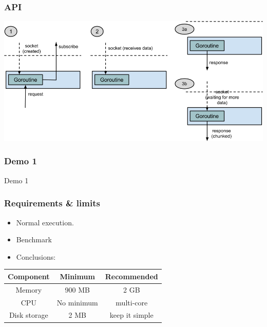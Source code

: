 \documentclass[12pt]{beamer}
\begin{document}
\begin{frame}
\vfill
  \frametitle{API}
  \begin{center}
    \includegraphics[scale=0.45]{images/api.png}
  \end{center}
\vfill
\end{frame}

\begin{frame}
\vfill
  \frametitle{Demo 1}
  \begin{center}
    \huge Demo 1
  \end{center}
\vfill
\end{frame}

\begin{frame}
\vfill
  \frametitle{Requirements \& limits}
  \begin{center}
    \begin{itemize}
      \item Normal execution.
      \item Benchmark
      \item Conclusions:
    \end{itemize}
    \vbox{}
    \begin{tabular}{ | c | c | c | }
      \hline
      Component & Minimum & Recommended \\ \hline
      Memory & 900 MB & 2 GB \\
      CPU & No minimum & multi-core \\
      Disk storage & 2 MB & keep it simple \\ \hline
    \end{tabular}
  \end{center}
\vfill
\end{frame}
\end{document}
